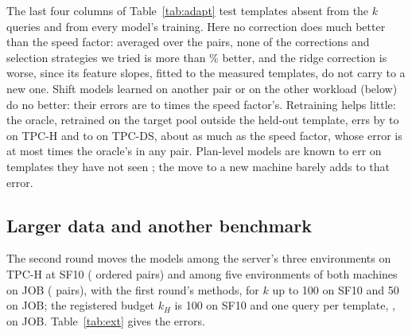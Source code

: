 \documentclass[conference]{IEEEtran}
\newcommand{\inputif}[1]{\IfFileExists{#1}{}{}}
\begin{document}
The last four columns of Table~\ref{tab:adapt} test templates absent from
the $k$ queries and from every model's training. Here no correction does
much better than the speed factor: averaged over the pairs, none of the
corrections and selection strategies we tried is more than
\XtraHardBestPct\% better, and the ridge correction is worse, since its
feature slopes, fitted to the measured templates, do not carry to a new one.
Shift models learned on another pair or on the other workload (below) do no
better: their errors are \XtraHardTransferMin{} to \XtraHardTransferMax{}
times the speed factor's. Retraining helps
little: the oracle, retrained on the target pool outside the held-out
template, errs by \PARTpchHardRandomOracleMin{} to
\PARTpchHardRandomOracleMax{} on TPC-H and \PARTpcdsHardRandomOracleMin{} to
\PARTpcdsHardRandomOracleMax{} on TPC-DS, about as much as the speed factor,
whose error is at most \PHHFourMaxAll{} times the oracle's in any pair.
Plan-level models are known to err on templates they have not seen
\cite{akdere2012}; the move to a new machine barely adds to that error.

\subsection{Larger data and another benchmark}
\label{sec:ext}

\begin{table}[t]
\caption{Error in the second round, as the geometric mean over the ordered pairs of each experiment, at $k=10$ and at $k_H$. The speed factor, affine+parallel and the ridge correction use random selection, the primary method and the fine-tuned network round robin, and 1-NN k-center. Oracle: the forest model refitted on the whole target pool; no move: the primary method on a model trained on the target itself.}
\label{tab:ext}
\small
\setlength{\tabcolsep}{3.5pt}
\centering
\inputif{../../results/paper/ext/table_ext.tex}
\end{table}

The second round moves the models among the server's three environments
on TPC-H at SF10 (\XTpchTenPairs{} ordered pairs) and among five
environments of both machines on JOB (\XJobPairs{} pairs), with the first
round's methods, for $k$ up to 100 on SF10 and 50 on JOB; the registered
budget $k_H$ is 100 on SF10 and one query per template, \XJobKH, on JOB.
Table~\ref{tab:ext} gives the errors.
\end{document}
